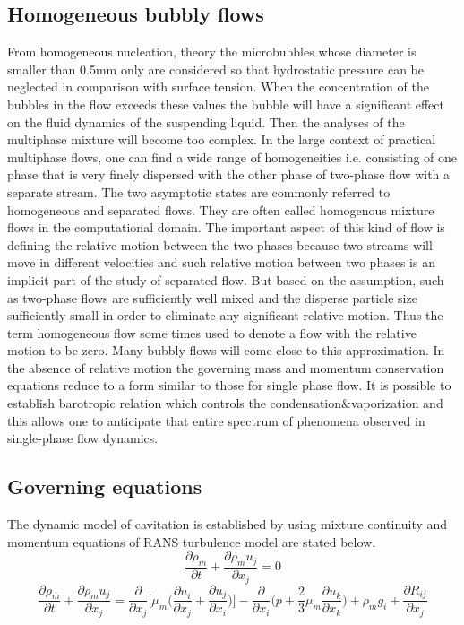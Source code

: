 \subsection{Homogeneous bubbly flows}
From homogeneous nucleation, theory \cite{FundamentalsofCavitation.2004}the microbubbles whose diameter is smaller than 0.5mm only are considered so that hydrostatic pressure can be neglected in comparison 
with surface tension. When the concentration of the bubbles in the flow exceeds these values the bubble will have a significant effect on the fluid dynamics of the suspending liquid.
Then the analyses of the multiphase mixture will become too complex. In the large context of practical multiphase flows, one can find a wide range of homogeneities i.e. consisting of one phase that is very finely 
dispersed with the other phase of two-phase flow with a separate stream. The two asymptotic states are commonly referred to homogeneous and separated flows. They are often called homogenous mixture flows in 
the computational domain. The important aspect of this kind of flow is defining the relative motion between the two phases because two streams will move in different velocities and such 
relative motion between two phases is an implicit part of the study of separated flow. But based on the assumption, such as two-phase flows are sufficiently well mixed and the disperse 
particle size sufficiently small in order to eliminate any significant relative motion. Thus the term homogeneous flow some times used to denote a flow with the relative motion to be zero. 
Many bubbly flows will come close to this approximation. In the absence of relative motion the governing mass and momentum conservation equations reduce to a form similar to those for single phase flow.
It is possible to establish barotropic relation which controls the condensation$\&$vaporization and this allows one to anticipate that entire spectrum of phenomena observed in single-phase flow dynamics.
\subsection{Governing equations}
The dynamic model of cavitation is established by using mixture continuity and momentum equations of RANS turbulence model are stated below\cite{Zhao2021}.
\begin{equation}
\frac{\partial{{\rho}_m}}{\partial t} + \frac{\partial{{{\rho}_m} u_j}}{\partial{x_j}} = 0
\end{equation}
\begin{equation}
\frac{\partial{{\rho}_m}}{\partial t} + \frac{\partial{{{\rho}_m} u_j}}{\partial{x_j}} =\frac{\partial}{\partial{x_j}}\Bigg[{\mu}_m\Bigg(\frac{\partial{u_i}}{\partial{x_j}}+\frac{\partial{u_j}}{\partial{x_i}}\Bigg)\Bigg]
-\frac{\partial}{\partial{x_i}} \Bigg({p}+{\frac{2}{3}}{\mu}_m \frac{\partial{u_k}}{\partial{x_k}}\Bigg) + {{\rho}_m}g_i +\frac{\partial{R_{ij}}}{\partial{x_j}}
\end{equation}


